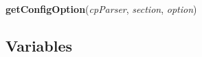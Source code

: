    \label{Cuon:getConfigOption}

    \vspace{0.5ex}

\hspace{.8\funcindent}\begin{boxedminipage}{\funcwidth}

    \raggedright \textbf{getConfigOption}(\textit{cpParser}, \textit{section}, \textit{option})

\setlength{\parskip}{2ex}
\setlength{\parskip}{1ex}
    \end{boxedminipage}



  \subsection{Variables}

